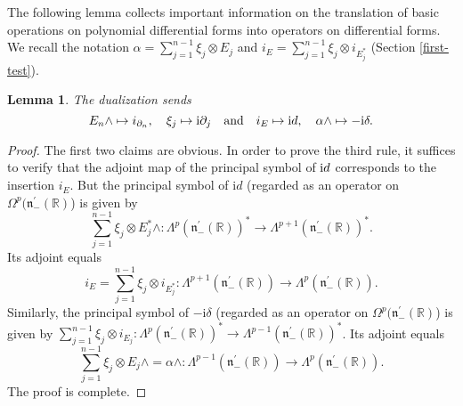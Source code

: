 \documentclass[a4paper,12pt,reqno]{amsart}
\newtheorem{lem}[theorem]{Lemma}
\numberwithin{theorem}{subsection}
\numberwithin{equation}{section}
\begin{document}
The following lemma collects important information on the translation of basic
operations on polynomial differential forms into operators on differential
forms. We recall the notation $\alpha = \sum_{j=1}^{n-1} \xi_j \otimes E_j$ and
$i_E = \sum_{j=1}^{n-1} \xi_j \otimes i_{E_j^*}$ (Section \ref{first-test}).

\begin{lem}\label{trans} The dualization sends
$$
   E_n \wedge \mapsto i_{\partial_n}, \quad \xi_j \mapsto {\rm{i}} \partial_j \quad
   \mbox{and} \quad i_E \mapsto {\rm{i}} d, \quad \alpha \wedge \mapsto -{\rm{i}} \delta.
$$
\end{lem}

\begin{proof} The first two claims are obvious. In order to prove the third rule, it suffices
to verify that the adjoint map of the principal symbol of ${\rm{i}} d$
corresponds to the insertion $i_E$. But the principal symbol of $\mathrm{i} d$
(regarded as an operator on $\Omega^p({{\mathfrak n}}_-^\prime({\mathbb{R}})$) is given by
$$
   \sum_{j=1}^{n-1} \xi_j \otimes E_j^* \wedge: \Lambda^p ({{\mathfrak n}}_-^\prime({\mathbb{R}}))^*
   \to \Lambda^{p+1} ({{\mathfrak n}}_-^\prime({\mathbb{R}}))^*.
$$
Its adjoint equals
$$
   i_E = \sum_{j=1}^{n-1} \xi_j \otimes i_{E^*_j}: \Lambda^{p+1} ({{\mathfrak n}}_-^\prime({\mathbb{R}}))
   \to \Lambda^{p} ({{\mathfrak n}}_-^\prime({\mathbb{R}})).
$$
Similarly, the principal symbol of $-\mathrm{i} \delta$ (regarded as an
operator on $\Omega^p({{\mathfrak n}}_-^\prime({\mathbb{R}})$) is given by $\sum_{j=1}^{n-1} \xi_j
\otimes i_{E_j}: \Lambda^p ({{\mathfrak n}}_-^\prime({\mathbb{R}}))^* \to \Lambda^{p-1}
({{\mathfrak n}}_-^\prime({\mathbb{R}}))^*$. Its adjoint equals
$$
   \sum_{j=1}^{n-1} \xi_j \otimes E_j \wedge = \alpha \wedge: \Lambda^{p-1} ({{\mathfrak n}}_-^\prime({\mathbb{R}}))
   \to \Lambda^{p}({{\mathfrak n}}_-^\prime({\mathbb{R}})).
$$
The proof is complete.
\end{proof}
\end{document}
